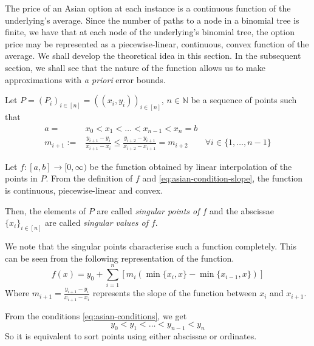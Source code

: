 The price of an Asian option at each instance is a continuous function of the underlying's average. Since the number of paths to a node in a binomial tree is finite, we have that at each node of the underlying's binomial tree, the option price may be represented as a piecewise-linear, continuous, convex function of the average. We shall develop the theoretical idea in this section. In the subsequent section, we shall see that the nature of the function allows us to make approximations with \emph{a priori} error bounds.


\begin{dfn} \label{def:asian-sp}
	Let $ P = (P_i)_{i \in [n]} = ( (x_i, y_i) )_{i \in [n]} $, $ n \in \mathbb{N} $ be a sequence of points such that
	\begin{subequations} \label{eq:asian-conditions}
		\begin{align}
			a =& x_0 < x_1 < \dots < x_{n-1} < x_n = b \\
			\label{eq:asian-condition-slope}
			m_{i+1} :=& \frac{y_{i+1} - y_{i}}{x_{i+1} - x_{i}} \le \frac{y_{i+2} - y_{i+1}}{x_{i+2} - x_{i+1}} = m_{i+2} \qquad \forall i \in \{ 1, \dots, n-1 \}
		\end{align}
	\end{subequations}
	
	Let $ f:[a,b] \to [0, \infty) $ be the function obtained by linear interpolation of the points in $P$. From the definition of $f$ and	 \ref{eq:asian-condition-slope}, the function is continuous, piecewise-linear and convex.
	
	Then, the elements of $P$ are called \emph{singular points of $f$} and the abscissae $ \{ x_i \}_{i \in [n]} $ are called \emph{singular values of $f$}.
\end{dfn}


\begin{rem}
	\label{rem:asian-char}
	We note that the singular points characterise such a function completely. This can be seen from the following representation of the function.
	\begin{equation}
		\label{eq:asian-function-repr}
		f(x) = y_0 + \sum_{i=1}^n [ m_i ( \min \{x_{i}, x \} - \min \{ x_{i-1}, x \} ) ]
	\end{equation}
	Where $ m_{i+1} = \frac{y_{i+1} - y_{i}}{x_{i+1} - x_{i}} $ represents the slope of the function between $ x_{i} $ and $ x_{i+1} $.
\end{rem}

\begin{rem}
	From the conditions \ref{eq:asian-conditions}, we get
	\begin{equation*}
		y_0 < y_1 < \dots < y_{n-1} < y_n
	\end{equation*}
	So it is equivalent to sort points using either abscissae or ordinates.
\end{rem}



